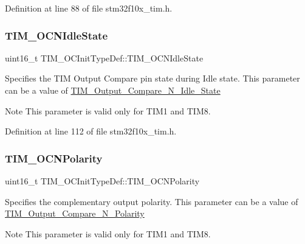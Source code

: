Definition at line 88 of file stm32f10x\+\_\+tim.\+h.

\mbox{\label{struct_t_i_m___o_c_init_type_def_a6cbbe6eb87c2ab49e4d68fa9703ce949}} 
\subsubsection{\texorpdfstring{T\+I\+M\+\_\+\+O\+C\+N\+Idle\+State}{TIM\_OCNIdleState}}
{\footnotesize\ttfamily uint16\+\_\+t T\+I\+M\+\_\+\+O\+C\+Init\+Type\+Def\+::\+T\+I\+M\+\_\+\+O\+C\+N\+Idle\+State}

Specifies the T\+IM Output Compare pin state during Idle state. This parameter can be a value of \hyperlink{group___t_i_m___output___compare___n___idle___state}{T\+I\+M\+\_\+\+Output\+\_\+\+Compare\+\_\+\+N\+\_\+\+Idle\+\_\+\+State} \begin{DoxyNote}{Note}
This parameter is valid only for T\+I\+M1 and T\+I\+M8. 
\end{DoxyNote}


Definition at line 112 of file stm32f10x\+\_\+tim.\+h.

\mbox{\label{struct_t_i_m___o_c_init_type_def_a3e47e672810747302c9d0626ae2ccb17}} 
\subsubsection{\texorpdfstring{T\+I\+M\+\_\+\+O\+C\+N\+Polarity}{TIM\_OCNPolarity}}
{\footnotesize\ttfamily uint16\+\_\+t T\+I\+M\+\_\+\+O\+C\+Init\+Type\+Def\+::\+T\+I\+M\+\_\+\+O\+C\+N\+Polarity}

Specifies the complementary output polarity. This parameter can be a value of \hyperlink{group___t_i_m___output___compare___n___polarity}{T\+I\+M\+\_\+\+Output\+\_\+\+Compare\+\_\+\+N\+\_\+\+Polarity} \begin{DoxyNote}{Note}
This parameter is valid only for T\+I\+M1 and T\+I\+M8. 
\end{DoxyNote}


